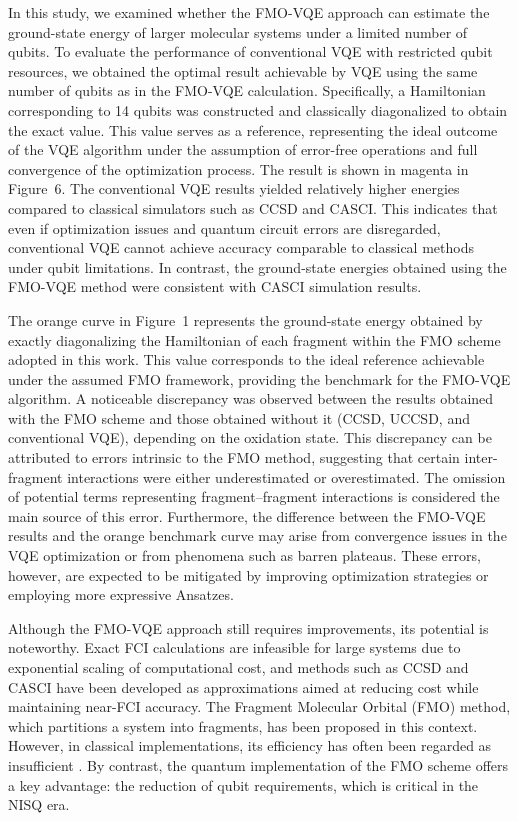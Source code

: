 \documentclass[pdflatex,sn-mathphys-num]{sn-jnl}%
\theoremstyle{thmstyleone}%
\theoremstyle{thmstyletwo}%
\theoremstyle{thmstylethree}%
\begin{document}
In this study, we examined whether the FMO-VQE approach can estimate the ground-state energy of larger molecular systems under a limited number of qubits.
To evaluate the performance of conventional VQE with restricted qubit resources, we obtained the optimal result achievable by VQE using the same number of qubits as in the FMO-VQE calculation. Specifically, a Hamiltonian corresponding to 14 qubits was constructed and classically diagonalized to obtain the exact value. This value serves as a reference, representing the ideal outcome of the VQE algorithm under the assumption of error-free operations and full convergence of the optimization process. The result is shown in magenta in Figure~6. The conventional VQE results yielded relatively higher energies compared to classical simulators such as CCSD and CASCI. This indicates that even if optimization issues and quantum circuit errors are disregarded, conventional VQE cannot achieve accuracy comparable to classical methods under qubit limitations. In contrast, the ground-state energies obtained using the FMO-VQE method were consistent with CASCI simulation results.

The orange curve in Figure~1 represents the ground-state energy obtained by exactly diagonalizing the Hamiltonian of each fragment within the FMO scheme adopted in this work. This value corresponds to the ideal reference achievable under the assumed FMO framework, providing the benchmark for the FMO-VQE algorithm. A noticeable discrepancy was observed between the results obtained with the FMO scheme and those obtained without it (CCSD, UCCSD, and conventional VQE), depending on the oxidation state. This discrepancy can be attributed to errors intrinsic to the FMO method, suggesting that certain inter-fragment interactions were either underestimated or overestimated. The omission of potential terms representing fragment–fragment interactions is considered the main source of this error. Furthermore, the difference between the FMO-VQE results and the orange benchmark curve may arise from convergence issues in the VQE optimization or from phenomena such as barren plateaus. These errors, however, are expected to be mitigated by improving optimization strategies or employing more expressive Ansatzes.

Although the FMO-VQE approach still requires improvements, its potential is noteworthy. Exact FCI calculations are infeasible for large systems due to exponential scaling of computational cost, and methods such as CCSD and CASCI have been developed as approximations aimed at reducing cost while maintaining near-FCI accuracy. The Fragment Molecular Orbital (FMO) method, which partitions a system into fragments, has been proposed in this context. However, in classical implementations, its efficiency has often been regarded as insufficient \cite{FMO10,FMO11}. By contrast, the quantum implementation of the FMO scheme offers a key advantage: the reduction of qubit requirements, which is critical in the NISQ era.
\end{document}
